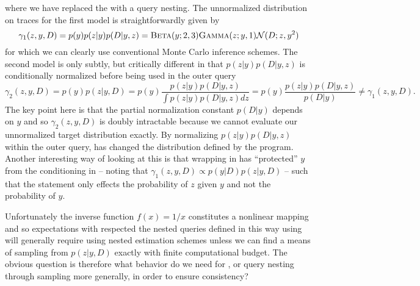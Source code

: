 \vspace{-15pt}
where we have replaced the  with a query nesting.  The unnormalized distribution on
traces for the first model is straightforwardly given by
\[
\gamma_1(z,y,D) = p(y)p(z|y)p(D|y,z) = \textsc{Beta}(y;2,3) \textsc{Gamma}(z;y,1) \mathcal{N}(D;z,y^2)
\]
for which we can clearly use conventional Monte Carlo inference schemes.  The second model
is only subtly, but critically different in that $p(z|y)p(D|y,z)$ is conditionally normalized 
before being used in the outer query
\[
\gamma_2(z,y,D) = p(y)p(z|y,D) = p(y)\frac{p(z|y)p(D|y,z)}{\int p(z|y)p(D|y,z)dz} = p(y)\frac{p(z|y)p(D|y,z)}{p(D|y)} \neq \gamma_1(z,y,D).
\]
The key point here is that the partial normalization constant $p(D|y)$ depends on $y$ and so 
$\gamma_2(z,y,D)$ is doubly intractable because we cannot evaluate our unnormalized target
distribution exactly.  By normalizing $p(z|y)p(D|y,z)$ within the outer query, 
 \conditional has changed the distribution defined by the program.  Another interesting way of looking at this
 is that wrapping  in \conditional has ``protected'' $y$ from the conditioning 
 in  -- noting
 that $\gamma_1 (z,y,D) \propto p(y|D)p(z|y,D)$ -- such that the \observe statement only effects the probability
 of $z$ given $y$ and not the probability of $y$.
 
 Unfortunately the inverse function $f(x) = 1/x$ constitutes
a nonlinear mapping and so expectations with respected the nested queries defined in this way using
\conditional will generally require using nested estimation schemes unless we can find a means of
sampling from $p(z|y,D)$ exactly with finite computational budget.
The obvious question is therefore what behavior do we need for \conditional, or query nesting through sampling
more generally, in order to ensure consistency?  

